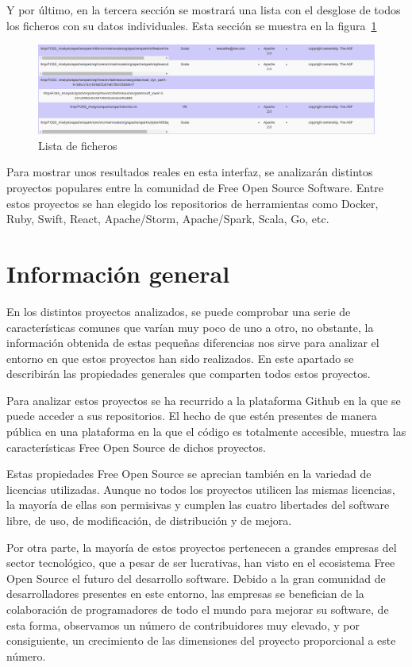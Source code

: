 \documentclass[a4paper, spanish, 12pt]{book}
\begin{document}
Y por \'ultimo, en la tercera secci\'on se mostrar\'a una lista con el desglose de todos
los ficheros con su datos individuales. Esta secci\'on se muestra en la figura~\ref{fig:third_row}

\begin{figure}
  \centering
  \includegraphics[width=12cm, keepaspectratio]{img/row_third}
  \caption{Lista de ficheros}
  \label{fig:third_row}
\end{figure}

Para mostrar unos resultados reales en esta interfaz, se analizar\'an distintos proyectos populares entre
la comunidad de Free Open Source Software. Entre estos proyectos se han elegido los
repositorios de herramientas como Docker, Ruby, Swift, React, Apache/Storm, Apache/Spark,
Scala, Go, etc.

\section{Informaci\'on general}
\label{sec:general_info}

En los distintos proyectos analizados, se puede comprobar una serie de caracter\'isticas
comunes que var\'ian muy poco de uno a otro, no obstante, la informaci\'on obtenida de
estas peque\~nas diferencias nos sirve para analizar el entorno en que estos proyectos
han sido realizados. En este apartado se describir\'an las propiedades generales que
comparten todos estos proyectos.

Para analizar estos proyectos se ha recurrido a la plataforma Github en la que se puede
acceder a sus repositorios. El hecho de que est\'en presentes de manera p\'ublica
en una plataforma en la que el c\'odigo es totalmente accesible, muestra las caracter\'isticas
Free Open Source de dichos proyectos.

Estas propiedades Free Open Source se aprecian tambi\'en en la variedad de licencias utilizadas.
Aunque no todos los proyectos utilicen las mismas licencias, la mayor\'ia de ellas son permisivas
y cumplen las cuatro libertades del software libre, de uso, de modificaci\'on, de distribuci\'on
y de mejora.

Por otra parte, la mayor\'ia de estos proyectos pertenecen a grandes empresas del sector tecnol\'ogico, que
a pesar de ser lucrativas, han visto en el ecosistema Free Open Source el futuro del desarrollo software.
Debido a la gran comunidad de desarrolladores presentes en este entorno, las empresas se benefician
de la colaboraci\'on de programadores de todo el mundo para mejorar su software, de esta forma,
observamos un n\'umero de contribuidores muy elevado, y por consiguiente, un crecimiento de
las dimensiones del proyecto proporcional a este n\'umero.
\end{document}
